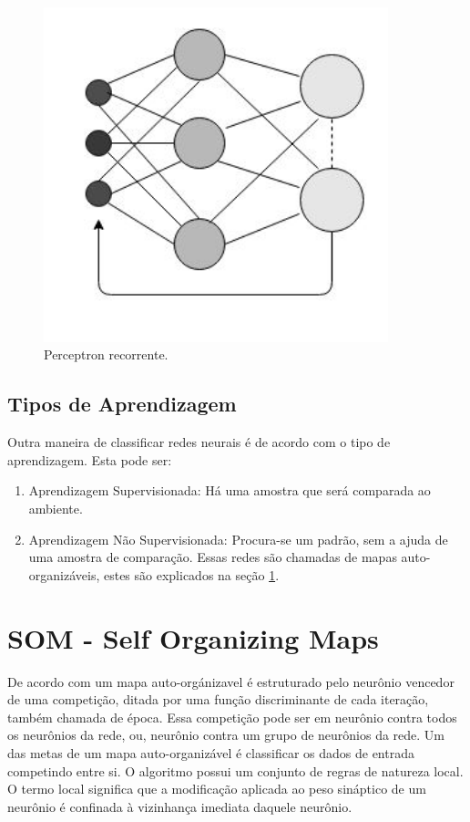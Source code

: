 \begin {enumerate}
\begin{figure}[H]
\centering %
\includegraphics[width=10cm]{img/rnarea.jpg} %
\caption{Perceptron recorrente.}
\label{fig:annrec}
\end{figure}


\end{enumerate}

\subsection{Tipos de Aprendizagem}
\label{sec:lear}
Outra maneira de classificar redes neurais é de acordo com o tipo de aprendizagem. Esta pode ser:
\begin {enumerate}
\item Aprendizagem Supervisionada: Há uma amostra  que será comparada ao ambiente.
\item Aprendizagem Não Supervisionada: Procura-se um padrão, sem a ajuda de uma amostra de comparação. Essas redes são chamadas de mapas auto-organizáveis, estes são explicados na seção \ref{sec:som}.
\end {enumerate}


\section {SOM - Self Organizing Maps}
\label{sec:som}
\quad  De acordo com \cite{ia}  um mapa auto-orgánizavel é estruturado pelo neurônio vencedor de uma competição, ditada por uma função discriminante de cada iteração, também chamada de época. Essa competição pode ser em neurônio contra todos os neurônios da rede, ou, neurônio contra um grupo de neurônios da rede. Um das metas de um mapa auto-organizável é classificar os dados de entrada competindo entre si. O algoritmo possui um conjunto de regras de natureza local. O termo local significa que a modificação aplicada ao peso sináptico de um neurônio é confinada à vizinhança imediata daquele neurônio.

